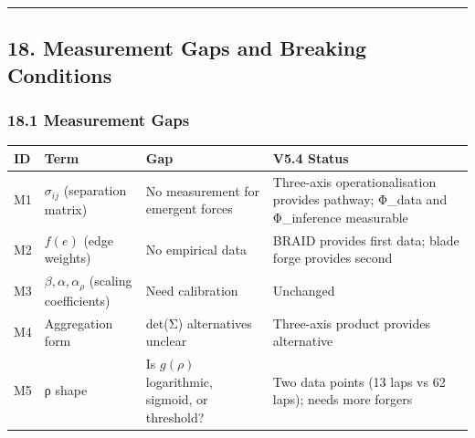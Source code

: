 \documentclass[
]{article}
\newcounter{none} %
\begin{document}
\begin{center}\rule{0.5\linewidth}{0.5pt}\end{center}

\subsection{18. Measurement Gaps and Breaking
Conditions}\label{measurement-gaps-and-breaking-conditions}

\subsubsection{18.1 Measurement Gaps}\label{measurement-gaps}

{\def\LTcaptype{none} %
\begin{longtable}[]{@{}
  >{\raggedright\arraybackslash}p{}
  >{\raggedright\arraybackslash}p{}
  >{\raggedright\arraybackslash}p{}
  >{\raggedright\arraybackslash}p{}@{}}
\toprule\noalign{}
\begin{minipage}[b]{\linewidth}\raggedright
ID
\end{minipage} & \begin{minipage}[b]{\linewidth}\raggedright
Term
\end{minipage} & \begin{minipage}[b]{\linewidth}\raggedright
Gap
\end{minipage} & \begin{minipage}[b]{\linewidth}\raggedright
V5.4 Status
\end{minipage} \\
\midrule\noalign{}
\endhead
\bottomrule\noalign{}
\endlastfoot
M1 & \(\sigma_{ij}\) (separation matrix) & No measurement for emergent
forces & Three-axis operationalisation provides pathway; Φ\_data and
Φ\_inference measurable \\
M2 & \(f(e)\) (edge weights) & No empirical data & BRAID provides first
data; blade forge provides second \\
M3 & \(\beta, \alpha, \alpha_\rho\) (scaling coefficients) & Need
calibration & Unchanged \\
M4 & Aggregation form & det(Σ) alternatives unclear & Three-axis product
provides alternative \\
M5 & ρ shape & Is \(g(\rho)\) logarithmic, sigmoid, or threshold? & Two
data points (13 laps vs 62 laps); needs more forgers \\
\end{longtable}
}
\end{document}

